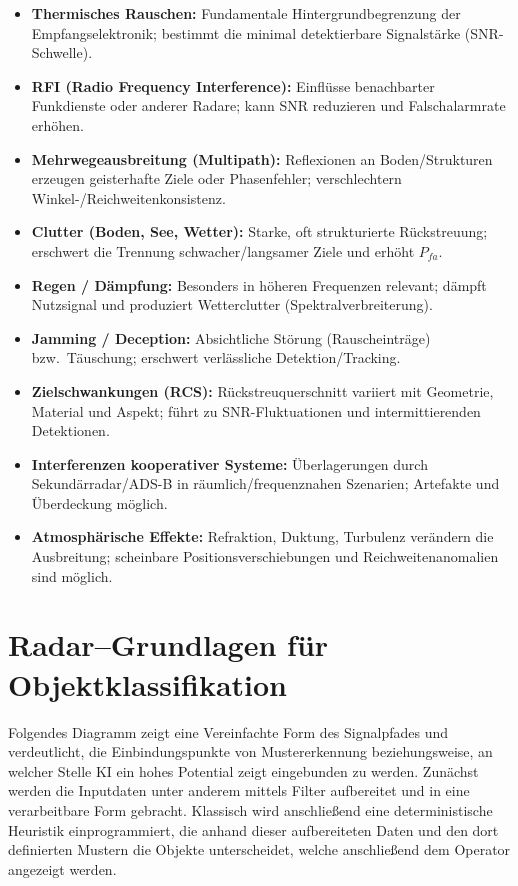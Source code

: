 \medskip
\begin{itemize}
  \item \textbf{Thermisches Rauschen:} Fundamentale Hintergrundbegrenzung der Empfangselektronik; bestimmt die minimal detektierbare Signalstärke (SNR-Schwelle).
  \item \textbf{RFI (Radio Frequency Interference):} Einflüsse benachbarter Funkdienste oder anderer Radare; kann SNR reduzieren und Falschalarmrate erhöhen.
  \item \textbf{Mehrwegeausbreitung (Multipath):} Reflexionen an Boden/Strukturen erzeugen geisterhafte Ziele oder Phasenfehler; verschlechtern Winkel-/Reichweitenkonsistenz.
  \item \textbf{Clutter (Boden, See, Wetter):} Starke, oft strukturierte Rückstreuung; erschwert die Trennung schwacher/langsamer Ziele und erhöht $P_{fa}$.
  \item \textbf{Regen / Dämpfung:} Besonders in höheren Frequenzen relevant; dämpft Nutzsignal und produziert Wetterclutter (Spektralverbreiterung).
  \item \textbf{Jamming / Deception:} Absichtliche Störung (Rauscheinträge) bzw.\ Täuschung; erschwert verlässliche Detektion/Tracking.
  \item \textbf{Zielschwankungen (RCS):} Rückstreuquerschnitt variiert mit Geometrie, Material und Aspekt; führt zu SNR-Fluktuationen und intermittierenden Detektionen.
  \item \textbf{Interferenzen kooperativer Systeme:} Überlagerungen durch Sekundärradar/ADS-B in räumlich/frequenznahen Szenarien; Artefakte und Überdeckung möglich.
  \item \textbf{Atmosphärische Effekte:} Refraktion, Duktung, Turbulenz verändern die Ausbreitung; scheinbare Positionsverschiebungen und Reichweitenanomalien sind möglich.
\end{itemize}


\section{Radar–Grundlagen für Objektklassifikation}\label{sec:radar-objklass}
Folgendes Diagramm zeigt eine Vereinfachte Form des Signalpfades und verdeutlicht, die Einbindungspunkte 
von Mustererkennung beziehungsweise, an welcher Stelle KI ein hohes Potential zeigt eingebunden zu werden.
Zunächst werden die Inputdaten unter anderem mittels Filter aufbereitet und in eine verarbeitbare Form gebracht.
Klassisch wird anschließend eine deterministische Heuristik einprogrammiert, 
die anhand dieser aufbereiteten Daten und den dort definierten Mustern die Objekte unterscheidet, 
welche anschließend dem Operator angezeigt werden.


